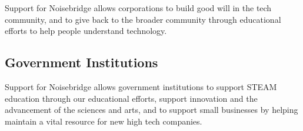 \documentclass[12pt]{article}
\begin{document}
Support for Noisebridge allows corporations to build good will in the tech community, and to give back to the broader community through educational efforts to help people understand technology.



\subsection{Government Institutions}

Support for Noisebridge allows government institutions to support STEAM education through our educational efforts, support innovation and the advancement of the sciences and arts, and to support small businesses by helping maintain a vital resource for new high tech companies.
\end{document}
